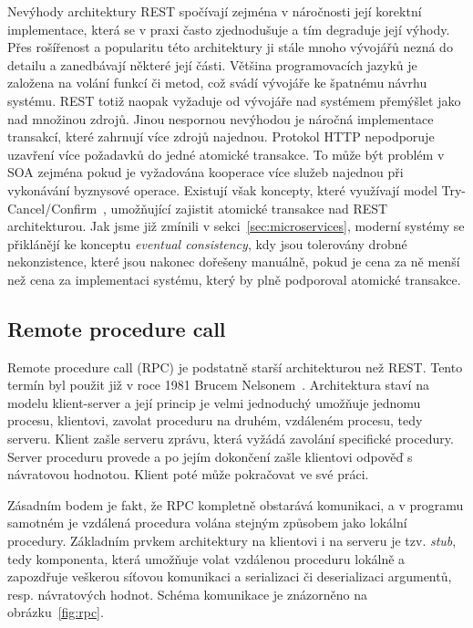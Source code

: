 Nevýhody architektury \gls{REST} spočívají zejména v náročnosti její korektní implementace,
která se v praxi často zjednodušuje a tím degraduje její výhody. Přes rošířenost a popularitu
této architektury ji stále mnoho vývojářů nezná do detailu a zanedbávají některé její části.
Většina programovacích jazyků je založena na volání funkcí či metod, což svádí vývojáře ke
špatnému návrhu systému. \gls{REST} totiž naopak vyžaduje od vývojáře nad systémem přemýšlet jako
nad množinou zdrojů. Jinou nespornou nevýhodou je náročná implementace transakcí, které zahrnují více
zdrojů najednou. Protokol \gls{HTTP} nepodporuje uzavření více požadavků do jedné atomické
transakce. To může být problém v \gls{SOA} zejména pokud je vyžadována kooperace více služeb
najednou při vykonávání byznysové operace. Existují však koncepty, které využívají model
Try-Cancel/Confirm~\cite{pardon2011towards}, umožňující zajistit atomické transakce nad \gls{REST} architekturou.
Jak jsme již zmínili v sekci~\ref{sec:microservices}, moderní systémy se přiklánějí ke konceptu
\textit{eventual consistency}, kdy jsou tolerovány drobné nekonzistence, které jsou nakonec
dořešeny manuálně, pokud je cena za ně menší než cena za implementaci systému, který
by plně podporoval atomické transakce.

\subsection{Remote procedure call}\label{sec:rpc}

Remote procedure call (\gls{RPC}) je podstatně starší architekturou než \gls{REST}.
Tento termín byl použit již v roce 1981 Brucem Nelsonem~\cite{nelson1981remote}.
Architektura staví na modelu klient-server a její princip je velmi jednoduchý \textendash
umožňuje jednomu procesu, klientovi, zavolat proceduru na druhém, vzdáleném procesu, tedy serveru.
Klient zašle serveru zprávu, která vyžádá zavolání specifické procedury. Server
proceduru provede a po jejím dokončení zašle klientovi odpověď s návratovou hodnotou.
Klient poté může pokračovat ve své práci.

Zásadním bodem je fakt, že \gls{RPC} kompletně obstarává komunikaci, a v programu samotném
je vzdálená procedura volána stejným způsobem jako lokální procedury. Základním
prvkem architektury na klientovi i na serveru je tzv. \textit{stub}, tedy komponenta, která
umožňuje volat vzdálenou proceduru lokálně a zapozdřuje veškerou síťovou komunikaci
a serializaci či deserializaci argumentů, resp. návratových hodnot. Schéma komunikace
je znázorněno na obrázku~\ref{fig:rpc}.

